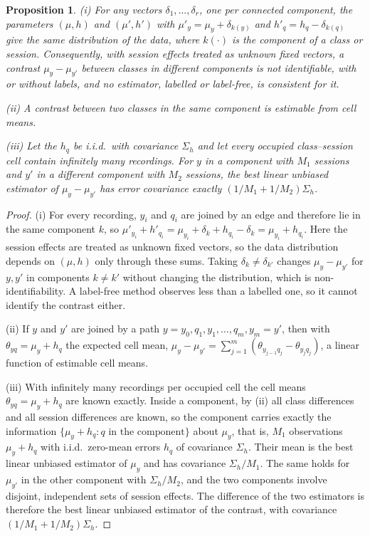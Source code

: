 \documentclass[10pt]{article}
\newtheorem{proposition}{Proposition}
\begin{document}
\begin{proposition}
(i) For any vectors $\delta_1,\dots,\delta_r$, one per connected component, the parameters $(\mu,h)$ and $(\mu',h')$ with $\mu'_y=\mu_y+\delta_{k(y)}$ and $h'_q=h_q-\delta_{k(q)}$ give the same distribution of the data, where $k(\cdot)$ is the component of a class or session. Consequently, with session effects treated as unknown fixed vectors, a contrast $\mu_y-\mu_{y'}$ between classes in different components is not identifiable, with or without labels, and no estimator, labelled or label-free, is consistent for it.

(ii) A contrast between two classes in the same component is estimable from cell means.

(iii) Let the $h_q$ be i.i.d.\ with covariance $\Sigma_h$ and let every occupied class--session cell contain infinitely many recordings. For $y$ in a component with $M_1$ sessions and $y'$ in a different component with $M_2$ sessions, the best linear unbiased estimator of $\mu_y-\mu_{y'}$ has error covariance exactly $(1/M_1+1/M_2)\Sigma_h$.
\end{proposition}
\begin{proof}
(i) For every recording, $y_i$ and $q_i$ are joined by an edge and therefore lie in the same component $k$, so $\mu'_{y_i}+h'_{q_i}=\mu_{y_i}+\delta_k+h_{q_i}-\delta_k=\mu_{y_i}+h_{q_i}$. Here the session effects are treated as unknown fixed vectors, so the data distribution depends on $(\mu,h)$ only through these sums. Taking $\delta_k\neq\delta_{k'}$ changes $\mu_y-\mu_{y'}$ for $y,y'$ in components $k\neq k'$ without changing the distribution, which is non-identifiability. A label-free method observes less than a labelled one, so it cannot identify the contrast either.

(ii) If $y$ and $y'$ are joined by a path $y=y_0,q_1,y_1,\dots,q_m,y_m=y'$, then with $\theta_{yq}=\mu_y+h_q$ the expected cell mean,
$\mu_y-\mu_{y'}=\sum_{j=1}^{m}(\theta_{y_{j-1}q_j}-\theta_{y_jq_j})$, a linear function of estimable cell means.

(iii) With infinitely many recordings per occupied cell the cell means $\theta_{yq}=\mu_y+h_q$ are known exactly. Inside a component, by (ii) all class differences and all session differences are known, so the component carries exactly the information $\{\mu_y+h_q: q \text{ in the component}\}$ about $\mu_y$, that is, $M_1$ observations $\mu_y+h_q$ with i.i.d.\ zero-mean errors $h_q$ of covariance $\Sigma_h$. Their mean is the best linear unbiased estimator of $\mu_y$ and has covariance $\Sigma_h/M_1$. The same holds for $\mu_{y'}$ in the other component with $\Sigma_h/M_2$, and the two components involve disjoint, independent sets of session effects. The difference of the two estimators is therefore the best linear unbiased estimator of the contrast, with covariance $(1/M_1+1/M_2)\Sigma_h$.
\end{proof}
\end{document}
